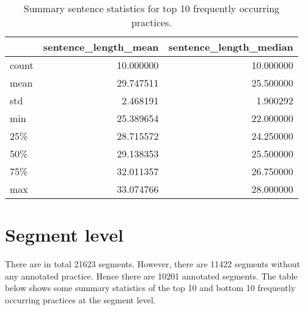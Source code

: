 \begin{table}
	\centering
	\begin{tabular}{lrr}
		\toprule
		{} &  sentence\_length\_mean &  sentence\_length\_median \\
		\midrule
		count &             10.000000 &               10.000000 \\
		mean  &             29.747511 &               25.500000 \\
		std   &              2.468191 &                1.900292 \\
		min   &             25.389654 &               22.000000 \\
		25\%   &             28.715572 &               24.250000 \\
		50\%   &             29.138353 &               25.500000 \\
		75\%   &             32.011357 &               26.750000 \\
		max   &             33.074766 &               28.000000 \\
		\bottomrule
		\end{tabular}
		\caption{Summary sentence statistics for top 10 frequently occurring practices.}
	\end{table}
	


\section{Segment level}

There are in total 21623 segments. However, there are 11422 segments without any annotated practice. Hence there are 10201 annotated segments. The table below shows some summary statistics of the top 10 and bottom 10 frequently occurring practices at the segment level.


